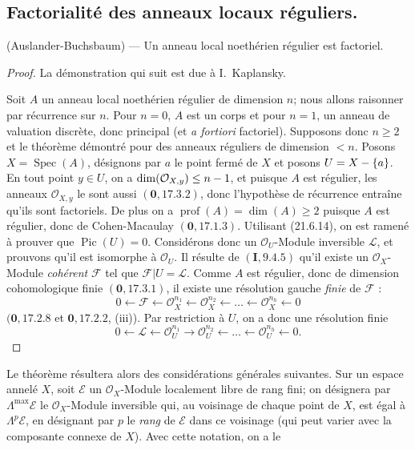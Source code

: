 \subsection{Factorialité des anneaux locaux réguliers.}
\label{IV.21.11}

\begin{theorem}[21.11.1]
\label{IV.21.11.1}
\textup{(Auslander-Buchsbaum)} ---
Un anneau local noethérien régulier est factoriel.
\end{theorem}

\begin{proof}
La démonstration qui suit est due à I.~Kaplansky.

Soit $A$ un anneau local noethérien régulier de dimension $n$; nous allons raisonner
par récurrence sur $n$. Pour $n=0$, $A$ est un corps et pour $n=1$, un anneau de
valuation discrète, donc principal (et \emph{a fortiori} factoriel). Supposons donc
$n\geq2$ et le théorème démontré pour des anneaux réguliers de dimension $<n$.
Posons $X=\operatorname{Spec}(A)$, désignons par $a$ le point fermé de $X$ et posons
$U=X-\{a\}$. En tout point $y\in U$, on a
$\dim(\mathcal O_{X,y})\leq n- 1$, et puisque $A$ est régulier, les anneaux
$\mathcal O_{X,y}$ le sont aussi $(\mathbf 0, 17.3.2)$, donc l'hypothèse de
récurrence entraîne qu'ils sont factoriels. De plus on a
$\operatorname{prof}(A)=\dim(A)\geq2$ puisque $A$ est régulier, donc de
Cohen-Macaulay $(\mathbf 0, 17.1.3)$.
Utilisant (21.6.14), on est ramené à prouver que $\operatorname{Pic}(U)=0$.
Considérons donc un $\mathcal O_U$-Module inversible $\mathscr L$, et prouvons qu'il
est isomorphe à $\mathcal O_U$. Il résulte de $(\mathbf I, 9.4.5)$ qu'il existe un
$\mathcal O_X$-Module \emph{cohérent} $\mathscr F$ tel que
$\mathscr F|U=\mathscr L$. Comme $A$ est régulier, donc de dimension cohomologique
finie $(\mathbf 0, 17.3.1)$, il existe une résolution gauche \emph{finie} de
$\mathscr F$ :
\[
  0\leftarrow\mathscr F\leftarrow\mathcal O_X^{n_1}
  \leftarrow\mathcal O_X^{n_2}\leftarrow\ldots
  \leftarrow\mathcal O_X^{n_h}\leftarrow0
\]
$(\mathbf 0, 17.2.8$ et $\mathbf 0, 17.2.2$, (iii)). Par restriction à $U$, on a
donc une résolution finie
\[
\label{IV.21.11.1.1}
  0\leftarrow\mathscr L\leftarrow\mathcal O_U^{n_1}
  \rightarrow\mathcal O_U^{n_2}\leftarrow\ldots
  \leftarrow\mathcal O_U^{n_h}\leftarrow0.
  \tag{21.11.1.1}
\]
\end{proof}

Le théorème résultera alors des considérations générales suivantes. Sur un espace
annelé $X$, soit $\mathscr E$ un $\mathcal O_X$-Module localement libre de rang fini;
on désignera par $\Lambda^{\max}\mathscr E$ le $\mathcal O_X$-Module inversible qui,
au voisinage de chaque point de $X$, est égal à $\Lambda^p\mathscr E$, en désignant
par $p$ le \emph{rang} de $\mathscr E$ dans ce voisinage (qui peut varier avec la composante
connexe de $X$). Avec cette notation, on a le

